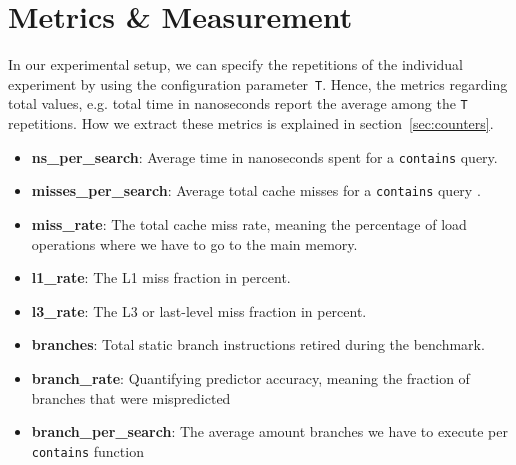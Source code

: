 \documentclass{article}
\begin{document}
\section{Metrics \& Measurement}
In our experimental setup, we can specify the repetitions of the individual experiment by using the configuration parameter~\texttt{T}. Hence, the metrics regarding total values, e.g. total time in nanoseconds report the average among the \texttt{T} repetitions. How we extract these metrics is explained in section~\ref{sec:counters}.
\begin{itemize}
  \item \textbf{ns\_per\_search}: Average time in nanoseconds spent for a \texttt{contains} query.  
  \item \textbf{misses\_per\_search}: Average total cache misses for a \texttt{contains} query . 
  \item \textbf{miss\_rate}: The total cache miss rate, meaning the percentage of load operations where we have to go to the main memory.  

  \item \textbf{l1\_rate}: The L1 miss fraction in percent.  
  \item \textbf{l3\_rate}: The L3 or last-level miss fraction in percent.   
  \item \textbf{branches}: Total static branch instructions retired during the benchmark.  
  \item \textbf{branch\_rate}: Quantifying predictor accuracy, meaning the fraction of branches that were mispredicted 
  \item \textbf{branch\_per\_search}: The average amount branches we have to execute per \texttt{contains} function  

\end{itemize}
\end{document}

